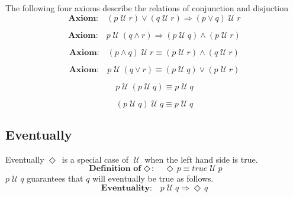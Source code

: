 \documentclass[fleqn, leqno]{article}
\newcommand{\Until}{\;\mathcal{U}\;}
\newcommand{\Event}{\Diamond\,}
\newcommand{\spacer}{\vspace{-30pt}}
\begin{document}
The following four axioms describe the relations of conjunction and disjuction
\begin{equation}\label{E:untilOrImp}
\textbf{Axiom:}\quad (p \Until r) \lor (q \Until r) \Rightarrow (p \lor q) \Until r
\end{equation}

\spacer

\begin{equation}\label{E:untilAndImp}
\textbf{Axiom:}\quad p \Until (q \land r) \Rightarrow (p \Until q) \land (p \Until r)
\end{equation}


\spacer

\begin{equation}\label{E:untilAndEquiv}
\textbf{Axiom:}\quad (p \land q) \Until r \equiv (p \Until r) \land (q \Until r)
\end{equation}

\spacer

\begin{equation}\label{E:untilOrEquiv}
\textbf{Axiom:}\quad p \Until (q \lor r) \equiv (p \Until q) \lor (p \Until r)
\end{equation}

\begin{equation}\label{E:untilIdem}
p \Until (p \Until q) \equiv p \Until q
\end{equation}

\begin{equation}\label{E:untilIdemR}
(p \Until q) \Until q \equiv p \Until q
\end{equation}

\subsection{Eventually}

Eventually $\Event$ is a special case of $\Until$ when the left hand side is true.
\begin{equation}\label{E:defEvent}
\textbf{Definition of $\Event$:}\quad \Event p \equiv true \Until p
\end{equation}
$p\Until q$ guarantees that $q$ will eventually be true as follows.
\begin{equation}\label{E:eventuality}
\textbf{Eventuality:}\quad p \Until q \Rightarrow \Event q
\end{equation}
\end{document}
